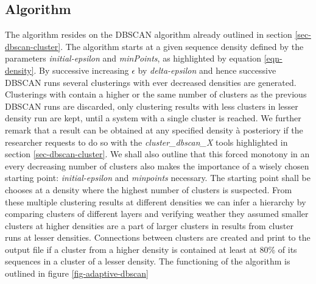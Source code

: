 \subsection{Algorithm}

The algorithm resides on the DBSCAN algorithm already outlined in
section \ref{sec-dbscan-cluster}. The algorithm starts at a given
sequence density defined by the parameters \emph{initial-epsilon} and
\emph{minPoints}, as highlighted by equation \ref{eqn-density}. By
successive increasing $\epsilon$ by \emph{delta-epsilon} and hence
successive DBSCAN runs several clusterings with ever decreased
densities are generated. Clusterings with contain a higher or the same
number of clusters as the previous DBSCAN runs are discarded, only
clustering results with less clusters in lesser density run are kept,
until a system with a single cluster is reached. We further remark
that a result can be obtained at any specified density à posteriory if
the researcher requests to do so with the \emph{cluster\_dbscan\_X}
tools highlighted in section \ref{sec-dbscan-cluster}. We shall also
outline that this forced monotony in an every decreasing number of
clusters also makes the importance of a wisely chosen starting point:
\emph{initial-epsilon} and \emph{minpoints} necessary. The starting
point shall be chooses at a density where the highest number of
clusters is suspected.
From these multiple clustering results at different densities we can
infer a hierarchy by comparing clusters of different layers and
verifying weather they assumed smaller clusters at higher densities
are a part of larger clusters in results from cluster runs at lesser
densities. Connections between clusters are created and print to the
output file if a cluster from a higher density is contained at least
at 80\% of its sequences in a cluster of a lesser density. The
functioning of the algorithm is outlined in figure
\ref{fig-adaptive-dbscan}
